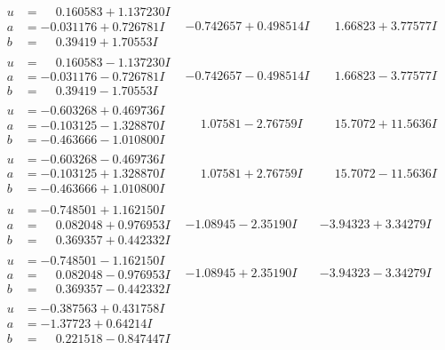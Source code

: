 \documentclass[1p]{elsarticle_modified}
\theoremstyle{definition}
\begin{document}
$$\begin{array}{c|c|c}
\begin{aligned}
u &= \phantom{-}0.160583 + 1.137230 I \\
a &= -0.031176 + 0.726781 I \\
b &= \phantom{-}0.39419 + 1.70553 I\end{aligned}
 & -0.742657 + 0.498514 I & \phantom{-}1.66823 + 3.77577 I \\ \hline\begin{aligned}
u &= \phantom{-}0.160583 - 1.137230 I \\
a &= -0.031176 - 0.726781 I \\
b &= \phantom{-}0.39419 - 1.70553 I\end{aligned}
 & -0.742657 - 0.498514 I & \phantom{-}1.66823 - 3.77577 I \\ \hline\begin{aligned}
u &= -0.603268 + 0.469736 I \\
a &= -0.103125 - 1.328870 I \\
b &= -0.463666 - 1.010800 I\end{aligned}
 & \phantom{-}1.07581 - 2.76759 I & \phantom{-}15.7072 + 11.5636 I \\ \hline\begin{aligned}
u &= -0.603268 - 0.469736 I \\
a &= -0.103125 + 1.328870 I \\
b &= -0.463666 + 1.010800 I\end{aligned}
 & \phantom{-}1.07581 + 2.76759 I & \phantom{-}15.7072 - 11.5636 I \\ \hline\begin{aligned}
u &= -0.748501 + 1.162150 I \\
a &= \phantom{-}0.082048 + 0.976953 I \\
b &= \phantom{-}0.369357 + 0.442332 I\end{aligned}
 & -1.08945 - 2.35190 I & -3.94323 + 3.34279 I \\ \hline\begin{aligned}
u &= -0.748501 - 1.162150 I \\
a &= \phantom{-}0.082048 - 0.976953 I \\
b &= \phantom{-}0.369357 - 0.442332 I\end{aligned}
 & -1.08945 + 2.35190 I & -3.94323 - 3.34279 I \\ \hline\begin{aligned}
u &= -0.387563 + 0.431758 I \\
a &= -1.37723 + 0.64214 I \\
b &= \phantom{-}0.221518 - 0.847447 I\end{aligned}

\end{array}$$
\end{document}
